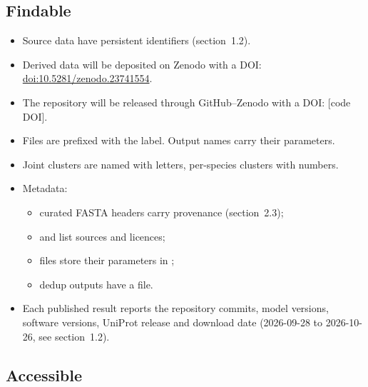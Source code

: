 \documentclass[11pt,a4paper]{article}
\newcommand{\tbd}[1]{\textcolor{BrickRed}{[#1]}}
\newcommand{\doi}[1]{\href{https://doi.org/#1}{doi:#1}}
\begin{document}
\subsection{Findable}

\begin{itemize}
\item Source data have persistent identifiers (section~1.2).
\item Derived data will be deposited on Zenodo with a DOI: \doi{10.5281/zenodo.23741554}.
\item The repository will be released through GitHub--Zenodo with a DOI: \tbd{code DOI}.
\item Files are prefixed with the label. Output names carry their parameters.
\item Joint clusters are named with letters, per-species clusters with numbers.
\item Metadata:
  \begin{itemize}
  \item curated FASTA headers carry provenance (section~2.3);
  \item {} and  list sources and licences;
  \item {} files store their parameters in ;
  \item dedup outputs have a  file.
  \end{itemize}
\item Each published result reports the repository commits, model versions, software versions, UniProt release and download date (2026-09-28 to 2026-10-26, see section~1.2).
\end{itemize}

\subsection{Accessible}
\end{document}
